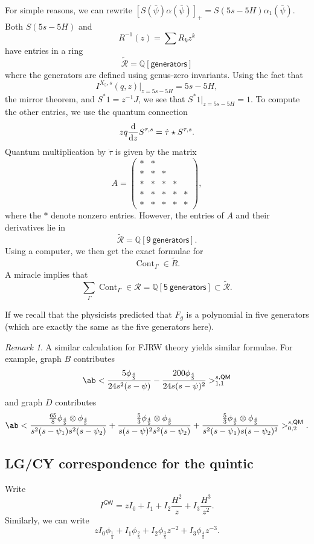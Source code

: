 \documentclass[10pt]{amsart}
\theoremstyle{definition}
\theoremstyle{remark}
\newtheorem{rmk}[thm]{Remark}
\theoremstyle{plain}
\theoremstyle{definition}
\theoremstyle{remark}
\newcommand{\Q}{\mathbb{Q}}
\newcommand{\mc}[1]{\mathcal{#1}}
\newcommand{\ms}[1]{\mathsf{#1}}
\newcommand{\1}{\mathbf{1}}
\newcommand{\2}{\mathbf{2}}
\newcommand{\3}{\mathbf{3}}
\newcommand{\GW}{\ms{GW}}
\newcommand{\QM}{\ms{QM}}
\DeclareMathOperator{\Cont}{Cont}
\begin{document}
For simple reasons, we can rewrite $[S(\bar{\psi})\alpha(\bar{\psi})]_+ = S(5s-5H) \alpha_1(\bar{\psi})$. Both $S(5s-5H)$ and
\[ R^{-1}(z) = \sum R_k z^k \]
have entries in a ring
\[ \tilde{\mc{R}} = \Q[\ms{generators}] \]
where the generators are defined using genus-zero invariants. Using the fact that
\[ I^{X_5,s}(q,z)|_{z = 5s-5H} = 5s-5H, \]
the mirror theorem, and $S^* 1 = z^{-1}J$, we see that $S^* 1 |_{z=5s-5H} = 1$. To compute the other entries, we use the quantum connection
\[ z q \odv{}{z}S^{\tau,s} = \dot{\tau} \star S^{\tau,s}. \]
Quantum multiplication by $\dot{\tau}$ is given by the matrix
\[ A = \begin{pmatrix}
    * & * \\
    * & * & * \\
    * & * & * & * \\
    * & * & * & * & * \\
    * & * & * & * & * 
\end{pmatrix}, \]
where the $*$ denote nonzero entries. However, the entries of $A$ and their derivatives lie in 
\[ \tilde{\mc{R}} = \Q[\ms{9\ generators}]. \]
Using a computer, we then get the exact formulae for
\[ \Cont_{\Gamma} \in \tilde{R}. \]
A miracle implies that
\[ \sum_{\Gamma} \Cont_{\Gamma} \in \mc{R} = \Q[\ms{5\ generators}] \subset \tilde{\mc{R}}. \]

If we recall that the physicists predicted that $F_g$ is a polynomial in five generators (which are exactly the same as the five generators here).

\begin{rmk}
    A similar calculation for FJRW theory yields similar formulae. For example, graph $B$ contributes
    \[ \ab<\frac{5 \phi_{\frac{4}{5}}}{24s^2(s-\psi)} - \frac{200 \phi_{\frac{4}{5}}}{24s(s-\psi)^2}>_{1,1}^{s,\QM} \]
    and graph $D$ contributes
    \[ \ab<\frac{\frac{65}{8} \phi_{\frac{4}{5}} \otimes \phi_{\frac{4}{5}}}{s^2(s-\psi_1)s^2(s-\psi_2)} + \frac{\frac{5}{3} \phi_{\frac{4}{5}} \otimes \phi_{\frac{4}{5}}}{s(s-\psi)^2 s^2 (s-\psi_2)} + \frac{\frac{5}{3} \phi_{\frac{4}{5}} \otimes \phi_{\frac{4}{5}}}{s^2(s-\psi_1)s(s-\psi_2)^2}>_{0,2}^{s,\QM}. \]
\end{rmk}

\subsection{LG/CY correspondence for the quintic}%
\label{sub:LG/CY correspondence for the quintic}

Write
\[ I^{\GW} = z I_0 + I_1 + I_2 \frac{H^2}{z} + I_3 \frac{H^3}{z^2}. \]
Similarly, we can write
\[ z I_0 \phi_{\frac{1}{5}} + I_1 \phi_{\frac{2}{5}} + I_2 \phi_{\frac{3}{5}} z^{-2} + I_3 \phi_{\frac{4}{5}} z^{-3}. \]
\end{document}
